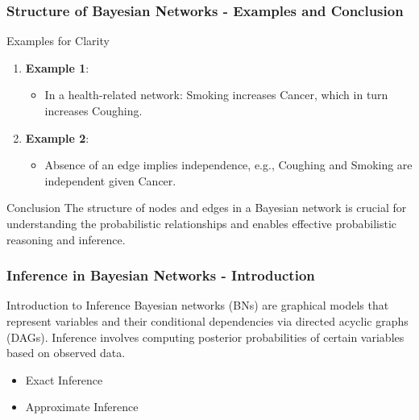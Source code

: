 \documentclass[aspectratio=169]{beamer}
\begin{document}
\begin{frame}[fragile]
    \frametitle{Structure of Bayesian Networks - Examples and Conclusion}
    \begin{block}{Examples for Clarity}
        \begin{enumerate}
            \item \textbf{Example 1}:
                \begin{itemize}
                    \item In a health-related network: Smoking increases Cancer, which in turn increases Coughing.
                \end{itemize}
            \item \textbf{Example 2}:
                \begin{itemize}
                    \item Absence of an edge implies independence, e.g., Coughing and Smoking are independent given Cancer.
                \end{itemize}
        \end{enumerate}
    \end{block}
    \begin{block}{Conclusion}
        The structure of nodes and edges in a Bayesian network is crucial for understanding the probabilistic relationships and enables effective probabilistic reasoning and inference.
    \end{block}
\end{frame}

\begin{frame}[fragile]
    \frametitle{Inference in Bayesian Networks - Introduction}
    \begin{block}{Introduction to Inference}
        Bayesian networks (BNs) are graphical models that represent variables and their conditional dependencies via directed acyclic graphs (DAGs).
        Inference involves computing posterior probabilities of certain variables based on observed data.
    \end{block}
    \begin{itemize}
        \item Exact Inference
        \item Approximate Inference
    \end{itemize}
\end{frame}
\end{document}
